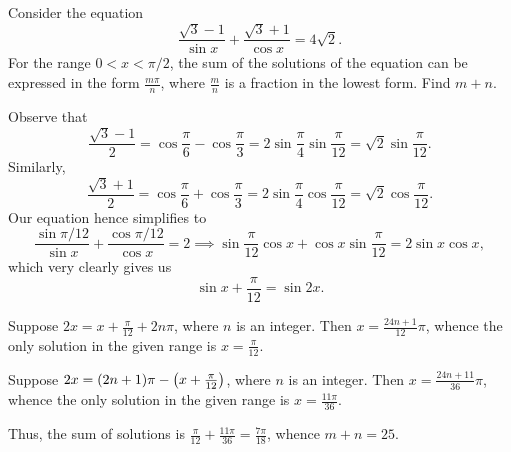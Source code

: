 \begin{question}[25]\label{A::2024-S-1-15}
    Consider the equation \[\frac{\sqrt3 - 1}{\sin x} + \frac{\sqrt3 + 1}{\cos x} = 4\sqrt2.\] For the range $0 < x < \pi/2$, the sum of the solutions of the equation can be expressed in the form $\frac{m\pi}{n}$, where $\frac{m}{n}$ is a fraction in the lowest form. Find $m + n$.
\end{question}
\begin{solution*}
    Observe that \[\frac{\sqrt3 - 1}{2} = \cos \frac\pi6 - \cos \frac\pi3 = 2\sin \frac\pi4 \sin \frac\pi{12} = \sqrt2 \sin \frac\pi{12}.\] Similarly, \[\frac{\sqrt3 + 1}{2} = \cos \frac\pi6 + \cos \frac\pi3 = 2\sin\frac\pi4 \cos\frac\pi{12} = \sqrt 2 \cos\frac\pi{12}.\] Our equation hence simplifies to \[\frac{\sin{\pi/12}}{\sin x} + \frac{\cos{\pi/12}}{\cos x} = 2 \implies \sin \frac\pi{12} \cos x + \cos x \sin \frac\pi{12} = 2\sin x \cos x,\] which very clearly gives us \[\sin{x + \frac\pi{12}} = \sin{2x}.\]

     Suppose $2x = x + \frac\pi{12} + 2n\pi$, where $n$ is an integer. Then $x = \frac{24n + 1}{12}\pi$, whence the only solution in the given range is $x = \frac{\pi}{12}$.

     Suppose $2x = (2n + 1)\pi - \left( x + \frac\pi{12} \right)$, where $n$ is an integer. Then $x = \frac{24n + 11}{36} \pi$, whence the only solution in the given range is $x = \frac{11\pi}{36}$.

    Thus, the sum of solutions is $\frac{\pi}{12} + \frac{11\pi}{36} = \frac{7\pi}{18}$, whence $m + n = 25$.
\end{solution*}

